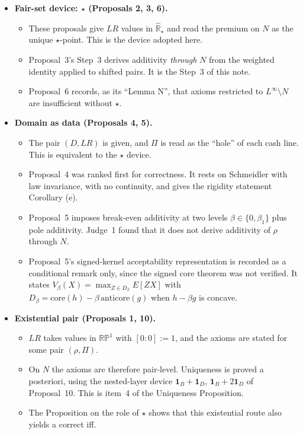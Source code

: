 \begin{itemize}
\item \textbf{Fair-set device: $\star$ (Proposals 2, 3, 6).}
  \begin{itemize}
  \item These proposals give $LR$ values in $\widehat{\mathbb R}_\star$ and read the premium on $N$ as the unique $\star$-point. This is the device adopted here.
  \item Proposal~3's Step~3 derives additivity \emph{through} $N$ from the weighted identity applied to shifted pairs. It is the Step~3 of this note.
  \item Proposal~6 records, as its ``Lemma N'', that axioms restricted to $L^\infty\setminus N$ are insufficient without $\star$.
  \end{itemize}
\item \textbf{Domain as data (Proposals 4, 5).}
  \begin{itemize}
  \item The pair $(D,LR)$ is given, and $\Pi$ is read as the ``hole'' of each cash line. This is equivalent to the $\star$ device.
  \item Proposal~4 was ranked first for correctness. It rests on Schmeidler with law invariance, with no continuity, and gives the rigidity statement Corollary (e).
  \item Proposal~5 imposes break-even additivity at two levels $\beta\in\{0,\beta_1\}$ plus pole additivity. Judge~1 found that it does not derive additivity of $\rho$ through $N$.
  \item Proposal~5's signed-kernel acceptability representation is recorded as a conditional remark only, since the signed core theorem was not verified. It states $V_\beta(X)=\max_{Z\in D_\beta}E[ZX]$ with $D_\beta=\mathrm{core}(h)-\beta\,\mathrm{anticore}(g)$ when $h-\beta g$ is concave.
  \end{itemize}
\item \textbf{Existential pair (Proposals 1, 10).}
  \begin{itemize}
  \item $LR$ takes values in $\mathbb{RP}^1$ with $[0:0]:=1$, and the axioms are stated for some pair $(\rho,\Pi)$.
  \item On $N$ the axioms are therefore pair-level. Uniqueness is proved a posteriori, using the nested-layer device $\mathbf 1_B+\mathbf 1_D$, $\mathbf 1_B+2\mathbf 1_D$ of Proposal~10. This is item~4 of the Uniqueness Proposition.
  \item The Proposition on the role of $\star$ shows that this existential route also yields a correct iff.

\end{itemize}
\end{itemize}
